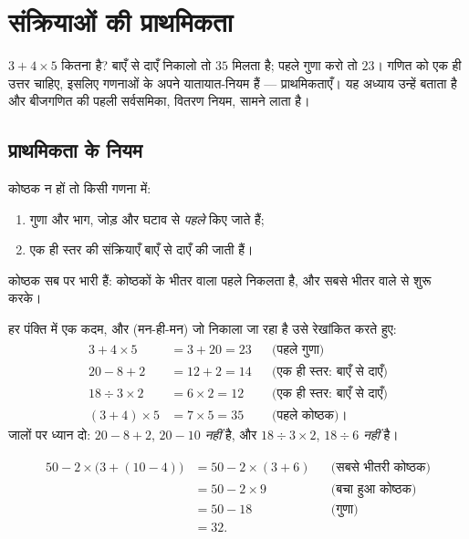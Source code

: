 \chapter{संक्रियाओं की प्राथमिकता}\label{ch:g7:priorities}

$3 + 4 \times 5$ कितना है? बाएँ से दाएँ निकालो तो $35$ मिलता है;
पहले गुणा करो तो $23$। गणित को एक ही उत्तर चाहिए, इसलिए गणनाओं
के अपने यातायात-नियम हैं --- प्राथमिकताएँ। यह अध्याय उन्हें बताता
है और बीजगणित की पहली सर्वसमिका, वितरण नियम, सामने लाता है।

\section{प्राथमिकता के नियम}

\begin{theorem}[प्राथमिकता के नियम]\label{thm:g7:priorities:rules}
कोष्ठक न हों तो किसी गणना में:
\begin{enumerate}
  \item गुणा और भाग, जोड़ और घटाव से \emph{पहले} किए जाते हैं;
  \item एक ही स्तर की संक्रियाएँ बाएँ से दाएँ की जाती हैं।
\end{enumerate}
कोष्ठक सब पर भारी हैं: कोष्ठकों के भीतर वाला पहले निकलता है, और
सबसे भीतर वाले से शुरू करके।
\end{theorem}

\begin{example}\label{ex:g7:priorities:basic}
हर पंक्ति में एक कदम, और (मन-ही-मन) जो निकाला जा रहा है उसे रेखांकित करते हुए:
\begin{align*}
3 + 4 \times 5 &= 3 + 20 = 23
&&\text{(पहले गुणा)}\\
20 - 8 + 2 &= 12 + 2 = 14
&&\text{(एक ही स्तर: बाएँ से दाएँ)}\\
18 \div 3 \times 2 &= 6 \times 2 = 12
&&\text{(एक ही स्तर: बाएँ से दाएँ)}\\
(3 + 4) \times 5 &= 7 \times 5 = 35
&&\text{(पहले कोष्ठक)।}
\end{align*}
जालों पर ध्यान दो: $20 - 8 + 2$, $20 - 10$ \emph{नहीं} है, और
$18 \div 3 \times 2$, $18 \div 6$ \emph{नहीं} है।
\end{example}

\begin{example}[कोष्ठक के भीतर कोष्ठक]\label{ex:g7:priorities:nested}
\begin{align*}
50 - 2 \times \bigl(3 + (10 - 4)\bigr)
&= 50 - 2 \times (3 + 6) && \text{(सबसे भीतरी कोष्ठक)}\\
&= 50 - 2 \times 9 && \text{(बचा हुआ कोष्ठक)}\\
&= 50 - 18 && \text{(गुणा)}\\
&= 32 .
\end{align*}
\end{example}

